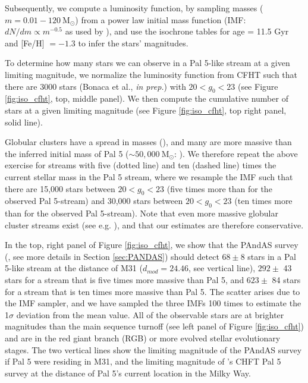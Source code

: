 \documentclass[twocolumn]{aastex62}
\newcommand{\msun}{\textrm{M}_\odot}
\begin{document}
Subsequently, we compute a luminosity function, by sampling masses ($m = 0.01 - 120 ~\msun$) from a power law initial mass function (IMF: $dN/dm \propto m^{-0.5}$ as used by \citealt{ibata16}), and use the isochrone tables for age = 11.5 Gyr and [Fe/H] $= -1.3$ to infer the stars' magnitudes. 

To determine how many stars we can observe in a Pal 5-like stream at a given limiting magnitude, we normalize the luminosity function from CFHT such that there are  $3000$ stars (Bonaca et al., {\it in prep.}) with $20 < g_0 < 23$ (see Figure \ref{fig:iso_cfht}, top, middle panel). We then compute the cumulative number of stars at a given limiting magnitude (see Figure \ref{fig:iso_cfht}, top right panel, solid line).

Globular clusters have a spread in masses (\citealt{harris96}), and many are more massive than the inferred initial mass of Pal 5 (${\sim} 50,000 ~\msun$: \citealt{ibata17}). We therefore repeat the above exercise for streams with five (dotted line) and ten (dashed line) times the current stellar mass in the Pal 5 stream, where we resample the IMF such that there are 15,000 stars between $20 < g _0< 23$  (five times more than for the observed Pal 5-stream) and 30,000  stars between $20 < g_0 < 23$ (ten times more than for the observed Pal 5-stream). Note that even more massive globular cluster streams exist (see e.g. \citealt{ibata19b}), and that our estimates are therefore conservative.

In the top, right panel of Figure \ref{fig:iso_cfht}, we show that the PAndAS survey (\citealt{McConnachie18}, see more details in Section \ref{sec:PANDAS}) should detect $68 \pm 8$ stars in a Pal 5-like stream at the distance of M31 ($d_{mod} = 24.46$, see vertical line), $292 \pm$ 43 stars for a stream that is five times more massive than Pal 5, and $623 \pm$ 84 stars for a stream that is ten times more massive than Pal 5. The scatter arises due to the IMF sampler, and we have sampled the three IMFs 100 times to estimate the 1$\sigma$ deviation from the mean value. All of the observable stars are at brighter magnitudes than the main sequence turnoff (see left panel of Figure \ref{fig:iso_cfht}) and are in the red giant branch (RGB) or more evolved stellar evolutionary stages. The two vertical lines show the limiting magnitude of the PAndAS  survey if Pal 5 were residing in M31, and the limiting magnitude of \citet{ibata16}'s CHFT Pal 5 survey at the distance of Pal 5's current location in the Milky Way. 
\end{document}

